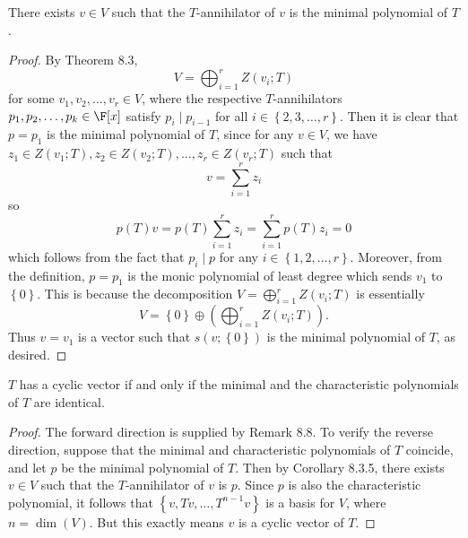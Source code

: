 \documentclass[linearalgebra]{subfiles}
\begin{document}
    \begin{cor}{}
        There exists $v\in V$ such that the $T$-annihilator of $v$ is the minimal polynomial of $T$.
    \end{cor}	

    \begin{proof}
        By Theorem 8.3,
        \begin{equation*}
            V = \bigoplus^{r}_{i=1} Z\left( v_i;T \right) 
        \end{equation*}
        for some $v_1,v_2,\ldots,v_r\in V$, where the respective $T$-annihilators $p_1,p_2,\ldots,p_k\in\F[x]$ satisfy $p_i\mid p_{i-1}$ for all $i\in \left\lbrace 2,3,\ldots,r \right\rbrace$. Then it is clear that $p=p_1$ is the minimal polynomial of $T$, since for any $v\in V$, we have $z_1\in Z(v_1;T), z_2\in Z(v_2;T), \ldots, z_r\in Z\left( v_r;T \right)$ such that
        \begin{equation*}
            v = \sum^{r}_{i=1} z_i
        \end{equation*}
        so
        \begin{equation*}
            p(T)v = p(T)\sum^{r}_{i=1} z_i = \sum^{r}_{i=1} p(T)z_i = 0
        \end{equation*}
        which follows from the fact that $p_i\mid p$ for any $i\in \left\lbrace 1,2,\ldots,r \right\rbrace$. Moreover, from the definition, $p=p_1$ is the monic polynomial of least degree which sends $v_1$ to $\left\lbrace 0 \right\rbrace$. This is because the decomposition $V=\bigoplus^{r}_{i=1} Z\left( v_i;T \right)$ is essentially
        \begin{equation*}
            V = \left\lbrace 0 \right\rbrace \oplus \left( \bigoplus^{r}_{i=1} Z\left( v_i;T \right)  \right) .
        \end{equation*}
        Thus $v=v_1$ is a vector such that $s\left( v;\left\lbrace 0 \right\rbrace  \right) $ is the minimal polynomial of $T$, as desired.
    \end{proof}

    \begin{cor}{}
        $T$ has a cyclic vector if and only if the minimal and the characteristic polynomials of $T$ are identical.
    \end{cor}	

    \begin{proof}
        The forward direction is supplied by Remark 8.8. To verify the reverse direction, suppose that the minimal and characteristic polynomials of $T$ coincide, and let $p$ be the minimal polynomial of $T$. Then by Corollary 8.3.5, there exists $v\in V$ such that the $T$-annihilator of $v$ is $p$. Since $p$ is also the characteristic polynomial, it follows that $\left\lbrace v,Tv, \ldots, T^{n-1}v \right\rbrace$ is a basis for $V$, where $n=\dim(V)$. But this exactly means $v$ is a cyclic vector of $T$.
    \end{proof}
\end{document}

